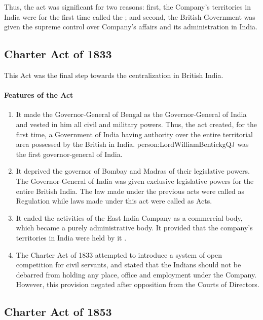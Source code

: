 Thus, the act was significant for two reasons: first, the Company's territories in India were for the first time called the ; and second, the British Government was given the supreme control over Company's affairs and its administration in India.

\subsection{Charter Act of 1833}

This Act was the final step towards the centralization in British India.

\paragraph{Features of the Act}
\begin{enumerate}
  \item It made the Governor-General of Bengal as the Governor-General of India and vested in him all civil and military powers. Thus, the act created, for the first time, a Government of India having authority over the entire territorial area possessed by the British in India. \gls{person:LordWilliamBentickgQJ} was the first governor-general of India.
  \item It deprived the governor of Bombay and Madras of their legislative powers. The Governor-General of India was given exclusive legislative powers for the entire British India. The law made under the previous acts were called as Regulation while laws made under this act were called as Acts.
  \item It ended the activities of the East India Company as a commercial body, which became a purely administrative body. It provided that the company's territories in India were held by it .
  \item The Charter Act of 1833 attempted to introduce a system of open competition for civil servants, and stated that the Indians should not be debarred from holding any place, office and employment under the Company. However, this provision negated after opposition from the Courts of Directors.
\end{enumerate}

\subsection{Charter Act of 1853}

